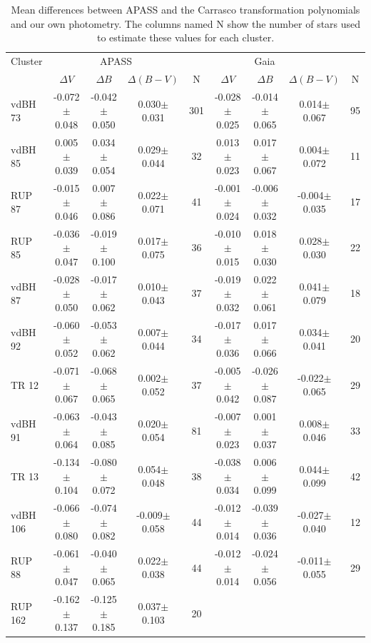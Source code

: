 \documentclass[referee]{aa}
\begin{document}
\begin{table}[ht]
    \centering
\caption{Mean differences between APASS and the Carrasco transformation
polynomials and our own photometry. The columns named N show the
number of stars used to estimate these values for each cluster.}
    \begin{tabular}{lcccc|cccc}
    \hline \hline 
Cluster & \multicolumn{3}{c}{APASS} & \multicolumn{4}{c}{Gaia}\\
 & $\Delta V$ & $\Delta B$ & $\Delta (B-V)$ & N & $\Delta V$ &
$\Delta B$ & $\Delta (B-V)$ & N\\
    \hline
vdBH 73   & -0.072$\pm$0.048 & -0.042$\pm$0.050 & 0.030$\pm$0.031 & 301 &
-0.028$\pm$0.025 & -0.014$\pm$0.065 & 0.014$\pm$0.067 & 95\\
vdBH 85   & 0.005$\pm$0.039 & 0.034$\pm$0.054 & 0.029$\pm$0.044 & 32 &
0.013$\pm$0.023 & 0.017$\pm$0.067 & 0.004$\pm$0.072 & 11\\
RUP 87    & -0.015$\pm$0.046 & 0.007$\pm$0.086 & 0.022$\pm$0.071 & 41 &
-0.001$\pm$0.024 & -0.006$\pm$0.032 & -0.004$\pm$0.035 & 17\\
RUP 85    & -0.036$\pm$0.047 & -0.019$\pm$0.100 & 0.017$\pm$0.075 & 36 &
-0.010$\pm$0.015 & 0.018$\pm$0.030 & 0.028$\pm$0.030 & 22\\
vdBH 87   & -0.028$\pm$0.050 & -0.017$\pm$0.062 & 0.010$\pm$0.043 & 37 &
-0.019$\pm$0.032 & 0.022$\pm$0.061 & 0.041$\pm$0.079 & 18\\
vdBH 92   & -0.060$\pm$0.052 & -0.053$\pm$0.062 & 0.007$\pm$0.044 & 34 &
-0.017$\pm$0.036 & 0.017$\pm$0.066 & 0.034$\pm$0.041 & 20\\
TR 12     & -0.071$\pm$0.067 & -0.068$\pm$0.065 & 0.002$\pm$0.052 & 37 &
-0.005$\pm$0.042 & -0.026$\pm$0.087 & -0.022$\pm$0.065 & 29\\
vdBH 91   & -0.063$\pm$0.064 & -0.043$\pm$0.085 & 0.020$\pm$0.054 & 81 &
-0.007$\pm$0.023 & 0.001$\pm$0.037 & 0.008$\pm$0.046 & 33\\
TR 13     & -0.134$\pm$0.104 & -0.080$\pm$0.072 & 0.054$\pm$0.048 & 38 &
-0.038$\pm$0.034 & 0.006$\pm$0.099 & 0.044$\pm$0.099 & 42\\
vdBH 106  & -0.066$\pm$0.080 & -0.074$\pm$0.082 & -0.009$\pm$0.058 & 44 &
-0.012$\pm$0.014 & -0.039$\pm$0.036 & -0.027$\pm$0.040 & 12\\
RUP 88    & -0.061$\pm$0.047 & -0.040$\pm$0.065 & 0.022$\pm$0.038 & 44 &
-0.012$\pm$0.014 & -0.024$\pm$0.056 & -0.011$\pm$0.055 & 29\\
RUP 162   & -0.162$\pm$0.137 & -0.125$\pm$0.185 & 0.037$\pm$0.103 & 20 &

\end{tabular}
\end{table}
\end{document}
